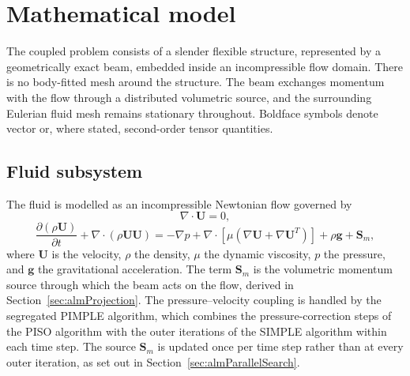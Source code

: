 \section{Mathematical model}
\label{sec:mathmodel}

\noindent
The coupled problem consists of a slender flexible structure, represented by a geometrically exact beam, embedded inside an incompressible flow domain. There is no body-fitted mesh around the structure. The beam exchanges momentum with the flow through a distributed volumetric source, and the surrounding Eulerian fluid mesh remains stationary throughout. Boldface symbols denote vector or, where stated, second-order tensor quantities.

\subsection{Fluid subsystem}
\label{sec:fluidSubsystem}

\noindent
The fluid is modelled as an incompressible Newtonian flow governed by
\begin{equation}
\nabla \cdot \mathbf{U} = 0,
\label{eq:continuity}
\end{equation}
\begin{equation}
\frac{\partial (\rho \mathbf{U})}{\partial t}
+ \nabla \cdot (\rho \mathbf{U}\mathbf{U})
= -\nabla p
+ \nabla \cdot \left[ \mu \left(\nabla \mathbf{U} + \nabla \mathbf{U}^{T}\right)\right]
+ \rho \mathbf{g}
+ \mathbf{S}_{m},
\label{eq:momentum}
\end{equation}
where $\mathbf{U}$ is the velocity, $\rho$ the density, $\mu$ the dynamic viscosity, $p$ the pressure, and $\mathbf{g}$ the gravitational acceleration. The term $\mathbf{S}_{m}$ is the volumetric momentum source through which the beam acts on the flow, derived in Section~\ref{sec:almProjection}. The pressure--velocity coupling is handled by the segregated PIMPLE algorithm, which combines the pressure-correction steps of the PISO algorithm \citep{issa_solution_1986} with the outer iterations of the SIMPLE algorithm \citep{patankar_calculation_1972} within each time step. The source $\mathbf{S}_{m}$ is updated once per time step rather than at every outer iteration, as set out in Section~\ref{sec:almParallelSearch}.

